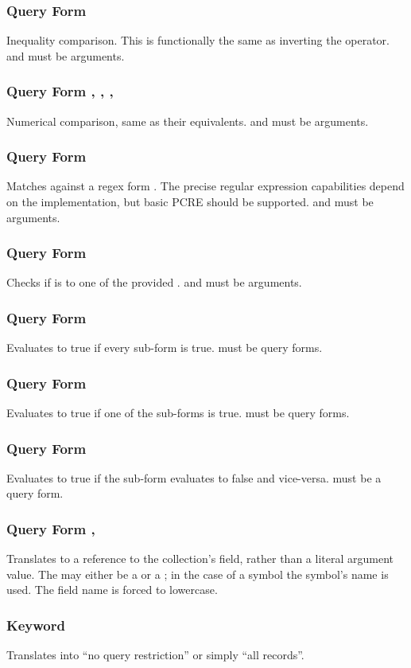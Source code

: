 \subsubsection{Query Form \inline{:!=}}
Inequality comparison. This is functionally the same as inverting the \inline{=} operator.  and  must be arguments.
\subsubsection{Query Form \inline{:>}, \inline{:<}, \inline{:<=}, \inline{:>=}}
Numerical comparison, same as their  equivalents.  and  must be arguments.
\subsubsection{Query Form }
Matches  against a regex form . The precise regular expression capabilities depend on the implementation, but basic PCRE should be supported.
 and  must be arguments.
\subsubsection{Query Form }
Checks if  is \inline{=} to one of the provided .
 and  must be arguments.
\subsubsection{Query Form }
Evaluates to true if every sub-form is true.
 must be query forms.
\subsubsection{Query Form }
Evaluates to true if one of the sub-forms is true.
 must be query forms.
\subsubsection{Query Form }
Evaluates to true if the sub-form evaluates to false and vice-versa.
 must be a query form.
\subsubsection{Query Form , }
Translates to a reference to the collection's field, rather than a literal argument value. The  may either be a  or a ; in the case of a symbol the symbol's name is used. The field name is forced to lowercase.
\subsubsection{Keyword }
Translates into ``no query restriction'' or simply ``all records''.
